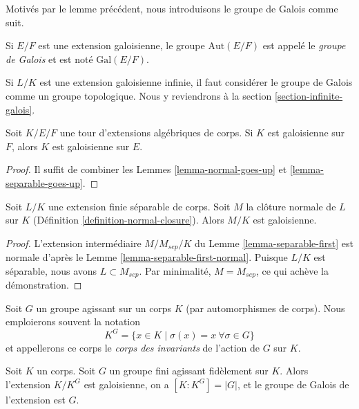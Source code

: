 \noindent
Motivés par le lemme précédent, nous introduisons le groupe de Galois comme suit.

\begin{definition}
\label{definition-galois-group}
Si $E/F$ est une extension galoisienne, le groupe $\text{Aut}(E/F)$ est
appelé le {\it groupe de Galois} et est noté $\text{Gal}(E/F)$.
\end{definition}

\noindent
Si $L/K$ est une extension galoisienne infinie, il faut considérer le
groupe de Galois comme un groupe topologique. Nous y reviendrons à la
section \ref{section-infinite-galois}.

\begin{lemma}
\label{lemma-galois-goes-up}
Soit $K/E/F$ une tour d'extensions algébriques de corps.
Si $K$ est galoisienne sur $F$, alors $K$ est galoisienne sur $E$.
\end{lemma}

\begin{proof}
Il suffit de combiner les Lemmes \ref{lemma-normal-goes-up} et \ref{lemma-separable-goes-up}.
\end{proof}

\begin{lemma}
\label{lemma-normal-closure-galois}
Soit $L/K$ une extension finie séparable de corps.
Soit $M$ la clôture normale de $L$ sur $K$
(Définition \ref{definition-normal-closure}).
Alors $M/K$ est galoisienne.
\end{lemma}

\begin{proof}
L'extension intermédiaire $M/M_{sep}/K$ du Lemme \ref{lemma-separable-first}
est normale d'après le Lemme \ref{lemma-separable-first-normal}.
Puisque $L/K$ est séparable, nous avons $L \subset M_{sep}$.
Par minimalité, $M = M_{sep}$, ce qui achève la démonstration.
\end{proof}

\noindent
Soit $G$ un groupe agissant sur un corps $K$ (par automorphismes de corps).
Nous emploierons souvent la notation
$$
K^G = \{x \in K \mid \sigma(x) = x \ \forall \sigma \in G\}
$$
et appellerons ce corps le {\it corps des invariants} de l'action de $G$ sur $K$.

\begin{lemma}
\label{lemma-galois-over-fixed-field}
Soit $K$ un corps. Soit $G$ un groupe fini agissant fidèlement sur $K$.
Alors l'extension $K/K^G$ est galoisienne, on a $[K : K^G] = |G|$,
et le groupe de Galois de l'extension est $G$.
\end{lemma}

